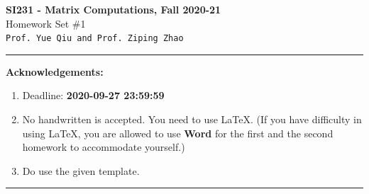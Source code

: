 \documentclass[english,onecolumn]{IEEEtran}
\begin{document}
\begin{center}
	\textbf{SI231 - Matrix Computations, Fall 2020-21}\\
	Homework Set \#1\\
	\texttt{Prof. Yue Qiu and Prof. Ziping Zhao} 
\par\end{center}


\noindent
\rule{\linewidth}{0.4pt}
{\bf Acknowledgements:}
\begin{enumerate}
	\item Deadline: {\bf 2020-09-27 23:59:59}
	\item No handwritten is accepted. You need to use \LaTeX. (If you have difficulty in using \LaTeX, you are allowed to use \textbf{Word} for the first and the second homework to accommodate yourself.)
	\item Do use the given template.
\end{enumerate}
\rule{\linewidth}{0.4pt}
\end{document}
